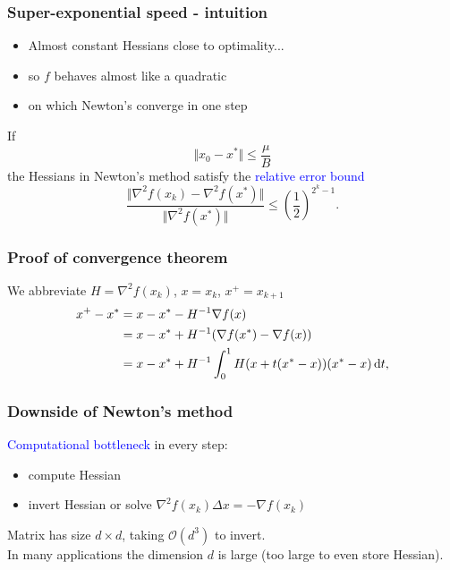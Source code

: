 \documentclass{beamer}
\begin{document}
\begin{frame}
  \frametitle{Super-exponential speed - intuition}

  \begin{itemize}
    \item Almost constant Hessians close to optimality...
    \item so $f$ behaves almost like a quadratic
    \item on which Newton's converge in one step
  \end{itemize}

  \begin{lemma}%
    If
    \begin{equation}
      \Vert x_0 - x^* \Vert \le \frac{\mu}{B}
    \end{equation}
    the Hessians in Newton's method satisfy the \textcolor{blue}{relative error bound}
    \begin{equation}
      \frac{\Vert  \nabla^2 f(x_k) - \nabla^2 f(x^*) \Vert}{\Vert \nabla^2 f(x^*) \Vert} \le {\left( \frac12 \right)}^{2^k-1}.
    \end{equation}
  \end{lemma}
\end{frame}


\begin{frame}
  \frametitle{Proof of convergence theorem}
  We abbreviate $H = \nabla^2 f(x_k)$, $x=x_k$, $x^+ = x_{k+1}$
  \begin{equation}
    \begin{aligned}
      x^+ - x^* &= x - x^* - H^{-1} \nabla f(x) \\
      &= x - x^* + H^{-1}( \nabla f(x^*) - \nabla f(x)) \\
      &= x - x^* + H^{-1} \int_{0}^{1} H(x + t(x^* - x))(x^* - x) \mathop{}\!\mathrm{d} t,
    \end{aligned}
  \end{equation}
\end{frame}


\begin{frame}
  \frametitle{Downside of Newton's method}
  \textcolor{blue}{Computational bottleneck} in every step:
  \begin{itemize}
    \item compute Hessian
    \item invert Hessian or solve $\nabla^2 f(x_k) \Delta x = - \nabla f(x_k)$
  \end{itemize}
  Matrix has size $d\times d$, taking $\mathcal{O}(d^3)$ to invert.\\
  In many applications the dimension $d$ is large (too large to even store Hessian).

\end{frame}
\end{document}
